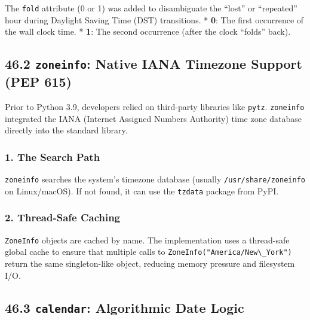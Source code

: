 The \passthrough{\lstinline!fold!} attribute (0 or 1) was added to
disambiguate the ``lost'' or ``repeated'' hour during Daylight Saving
Time (DST) transitions. * \textbf{0}: The first occurrence of the wall
clock time. * \textbf{1}: The second occurrence (after the clock
``folds'' back).

\hypertarget{zoneinfo-native-iana-timezone-support-pep-615}{%
\subsection{\texorpdfstring{46.2 \texttt{zoneinfo}: Native IANA Timezone
Support (PEP
615)}{46.2 zoneinfo: Native IANA Timezone Support (PEP 615)}}\label{zoneinfo-native-iana-timezone-support-pep-615}}

Prior to Python 3.9, developers relied on third-party libraries like
\passthrough{\lstinline!pytz!}. \passthrough{\lstinline!zoneinfo!}
integrated the IANA (Internet Assigned Numbers Authority) time zone
database directly into the standard library.

\hypertarget{the-search-path}{%
\subsubsection{1. The Search Path}\label{the-search-path}}

\passthrough{\lstinline!zoneinfo!} searches the system's timezone
database (usually \passthrough{\lstinline!/usr/share/zoneinfo!} on
Linux/macOS). If not found, it can use the
\passthrough{\lstinline!tzdata!} package from PyPI.

\hypertarget{thread-safe-caching}{%
\subsubsection{2. Thread-Safe Caching}\label{thread-safe-caching}}

\passthrough{\lstinline!ZoneInfo!} objects are cached by name. The
implementation uses a thread-safe global cache to ensure that multiple
calls to \passthrough{\lstinline!ZoneInfo("America/New\_York")!} return
the same singleton-like object, reducing memory pressure and filesystem
I/O.

\hypertarget{calendar-algorithmic-date-logic}{%
\subsection{\texorpdfstring{46.3 \texttt{calendar}: Algorithmic Date
Logic}{46.3 calendar: Algorithmic Date Logic}}\label{calendar-algorithmic-date-logic}}

